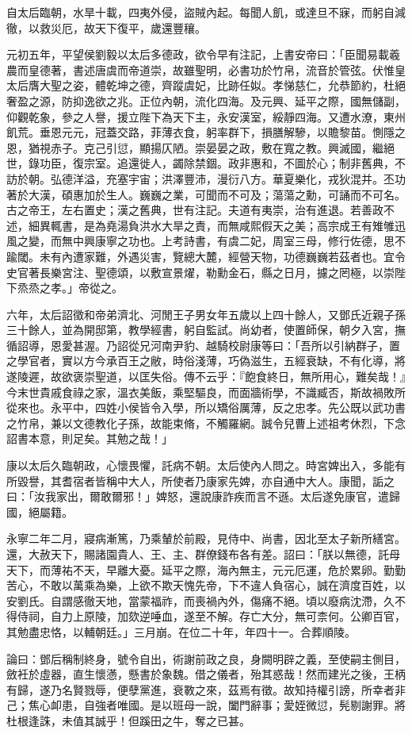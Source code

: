 \begin{pinyinscope}
自太后臨朝，水旱十載，四夷外侵，盜賊內起。每聞人飢，或達旦不寐，而躬自減徹，以救災厄，故天下復平，歲還豐穰。

元初五年，平望侯劉毅以太后多德政，欲令早有注記，上書安帝曰：「臣聞易載羲農而皇德著，書述唐虞而帝道崇，故雖聖明，必書功於竹帛，流音於管弦。伏惟皇太后膺大聖之姿，體乾坤之德，齊蹤虞妃，比跡任姒。孝悌慈仁，允恭節約，杜絕奢盈之源，防抑逸欲之兆。正位內朝，流化四海。及元興、延平之際，國無儲副，仰觀乾象，參之人譽，援立陛下為天下主，永安漢室，綏靜四海。又遭水潦，東州飢荒。垂恩元元，冠蓋交路，菲薄衣食，躬率群下，損膳解驂，以贍黎苗。惻隱之恩，猶視赤子。克己引愆，顯揚仄陋。崇晏晏之政，敷在寬之教。興滅國，繼絕世，錄功臣，復宗室。追還徙人，蠲除禁錮。政非惠和，不圖於心；制非舊典，不訪於朝。弘德洋溢，充塞宇宙；洪澤豐沛，漫衍八方。華夏樂化，戎狄混并。丕功著於大漢，碩惠加於生人。巍巍之業，可聞而不可及；蕩蕩之勳，可誦而不可名。古之帝王，左右置史；漢之舊典，世有注記。夫道有夷崇，治有進退。若善政不述，細異輒書，是為堯湯負洪水大旱之責，而無咸熙假天之美；高宗成王有雉雊迅風之變，而無中興康寧之功也。上考詩書，有虞二妃，周室三母，修行佐德，思不踰閾。未有內遭家難，外遇災害，覽總大麓，經營天物，功德巍巍若茲者也。宜令史官著長樂宮注、聖德頌，以敷宣景燿，勒勳金石，縣之日月，攄之罔極，以崇陛下烝烝之孝。」帝從之。

六年，太后詔徵和帝弟濟北、河閒王子男女年五歲以上四十餘人，又鄧氏近親子孫三十餘人，並為開邸第，教學經書，躬自監試。尚幼者，使置師保，朝夕入宮，撫循詔導，恩愛甚渥。乃詔從兄河南尹豹、越騎校尉康等曰：「吾所以引納群子，置之學官者，實以方今承百王之敝，時俗淺薄，巧偽滋生，五經衰缺，不有化導，將遂陵遲，故欲褒崇聖道，以匡失俗。傳不云乎：『飽食終日，無所用心，難矣哉！』今末世貴戚食祿之家，溫衣美飯，乘堅驅良，而面牆術學，不識臧否，斯故禍敗所從來也。永平中，四姓小侯皆令入學，所以矯俗厲薄，反之忠孝。先公既以武功書之竹帛，兼以文德教化子孫，故能束脩，不觸羅網。誠令兒曹上述祖考休烈，下念詔書本意，則足矣。其勉之哉！」

康以太后久臨朝政，心懷畏懼，託病不朝。太后使內人問之。時宮婢出入，多能有所毀譽，其耆宿者皆稱中大人，所使者乃康家先婢，亦自通中大人。康聞，詬之曰：「汝我家出，爾敢爾邪！」婢怒，還說康詐疾而言不遜。太后遂免康官，遣歸國，絕屬籍。

永寧二年二月，寢病漸篤，乃乘輦於前殿，見侍中、尚書，因北至太子新所繕宮。還，大赦天下，賜諸園貴人、王、主、群僚錢布各有差。詔曰：「朕以無德，託母天下，而薄祐不天，早離大憂。延平之際，海內無主，元元厄運，危於累卵。勤勤苦心，不敢以萬乘為樂，上欲不欺天愧先帝，下不違人負宿心，誠在濟度百姓，以安劉氏。自謂感徹天地，當蒙福祚，而喪禍內外，傷痛不絕。頃以廢病沈滯，久不得侍祠，自力上原陵，加欬逆唾血，遂至不解。存亡大分，無可柰何。公卿百官，其勉盡忠恪，以輔朝廷。」三月崩。在位二十年，年四十一。合葬順陵。

論曰：鄧后稱制終身，號令自出，術謝前政之良，身闕明辟之義，至使嗣主側目，斂衽於虛器，直生懷懣，懸書於象魏。借之儀者，殆其惑哉！然而建光之後，王柄有歸，遂乃名賢戮辱，便孽黨進，衰斁之來，茲焉有徵。故知持權引謗，所幸者非己；焦心卹患，自強者唯國。是以班母一說，闔門辭事；愛姪微愆，髡剔謝罪。將杜根逢誅，未值其誠乎！但蹊田之牛，奪之已甚。


\end{pinyinscope}